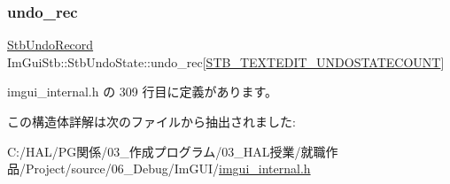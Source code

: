 \mbox{\label{struct_im_gui_stb_1_1_stb_undo_state_a3cba4c0766038584aa310a52e763bbda}} 
\subsubsection{\texorpdfstring{undo\+\_\+rec}{undo\_rec}}
{\footnotesize\ttfamily \mbox{\hyperlink{struct_im_gui_stb_1_1_stb_undo_record}{Stb\+Undo\+Record}} Im\+Gui\+Stb\+::\+Stb\+Undo\+State\+::undo\+\_\+rec\mbox{[}\mbox{\hyperlink{stb__textedit_8h_afa79483143df87a1497010712b3dfaf9}{S\+T\+B\+\_\+\+T\+E\+X\+T\+E\+D\+I\+T\+\_\+\+U\+N\+D\+O\+S\+T\+A\+T\+E\+C\+O\+U\+NT}}\mbox{]}}



 imgui\+\_\+internal.\+h の 309 行目に定義があります。



この構造体詳解は次のファイルから抽出されました\+:\begin{DoxyCompactItemize}
\item 
C\+:/\+H\+A\+L/\+P\+G関係/03\+\_\+作成プログラム/03\+\_\+\+H\+A\+L授業/就職作品/\+Project/source/06\+\_\+\+Debug/\+Im\+G\+U\+I/\mbox{\hyperlink{imgui__internal_8h}{imgui\+\_\+internal.\+h}}\end{DoxyCompactItemize}

